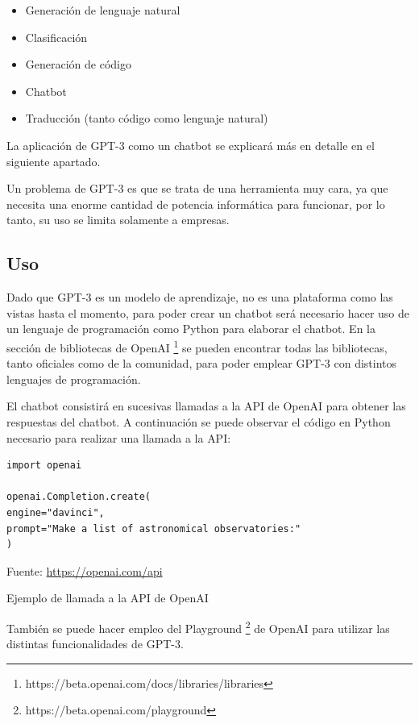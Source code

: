 \begin{itemize}
\item Generación de lenguaje natural
\item Clasificación
\item Generación de código
\item Chatbot
\item Traducción (tanto código como lenguaje natural)
\end{itemize}

La aplicación de GPT-3 como un chatbot se explicará más en detalle en el siguiente apartado.

Un problema de GPT-3 es que se trata de una herramienta muy cara, ya que necesita una enorme cantidad de potencia informática para funcionar, por lo tanto, su uso se limita solamente a empresas.

\subsection*{Uso}

Dado que GPT-3 es un modelo de aprendizaje, no es una plataforma como las vistas hasta el momento, para poder crear un chatbot será necesario hacer uso de un lenguaje de programación como Python para elaborar el chatbot. En la sección de bibliotecas de OpenAI \footnote{https://beta.openai.com/docs/libraries/libraries} se pueden encontrar todas las bibliotecas, tanto oficiales como de la comunidad, para poder emplear GPT-3 con distintos lenguajes de programación.

El chatbot consistirá en sucesivas llamadas a la \gls{API} de OpenAI para obtener las respuestas del chatbot. A continuación se puede observar el código en Python necesario para realizar una llamada a la \gls{API}:

\begin{lstlisting}
import openai

openai.Completion.create(
engine="davinci",
prompt="Make a list of astronomical observatories:"
)
\end{lstlisting}
\begin{center}
Fuente: \url{https://openai.com/api}
\end{center}
\begin{center}
\caption{Ejemplo de llamada a la API de OpenAI}
\end{center}

También se puede hacer empleo del Playground \footnote{https://beta.openai.com/playground} de OpenAI para utilizar las distintas funcionalidades de GPT-3.

